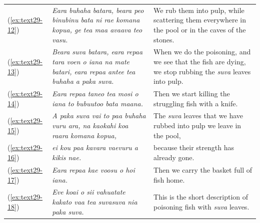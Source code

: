 \documentclass[output=paper]{langscibook}
\begin{document}
\begin{xltabular}{\textwidth}{lXX}
	(\ref{ex:text29-12})&\textit{Eara buhaha batara, beara peo binubinu bata ni rae komana kopua, ge tea maa avaava teo vasu.}&We rub them into pulp, while scattering them everywhere in the pool or in the caves of the stones.\\
	(\ref{ex:text29-13})&\textit{Beara suva batara, eara repaa tara voen o iana na mate batari, eara repaa antee tea buhaha a paka suva.}&When we do the poisoning, and we see that the fish are dying, we stop rubbing the \textit{suva} leaves into pulp.\\
	(\ref{ex:text29-14})&\textit{Eara repaa taneo tea mosi o iana to bubuutoo bata maana.}&Then we start killing the struggling fish with a knife.\\
	(\ref{ex:text29-15})&\textit{A paka suva vai to paa buhaha vuru ara, na kaokahi koa raara komana kopua,}&The \textit{suva} leaves that we have rubbed into pulp we leave in the pool,\\
	(\ref{ex:text29-16})&\textit{ei kou paa kavara vaevuru a kikis nae.}&because their strength has already gone.\\
	(\ref{ex:text29-17})&\textit{Eara repaa kae voosu o hoi iana.}&Then we carry the basket full of fish home.\\
	(\ref{ex:text29-18})&\textit{Eve koai o sii vahuatate kakato vaa tea suvasuva nia paka suva.}&This is the short description of poisoning fish with \textit{suva} leaves.\\
\end{xltabular}
\end{document}
